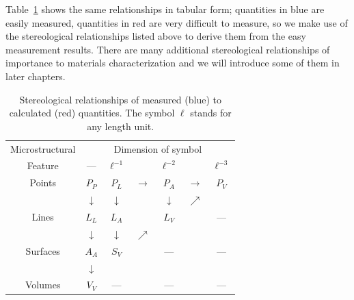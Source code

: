 Table~\ref{\chabbr:tb:relations} shows the same relationships in tabular form; quantities in blue are easily measured, quantities in red are very difficult to measure, so we make use of the stereological relationships listed above to derive them from the easy measurement results.  There are many additional stereological relationships of importance to materials characterization and we will introduce some of them in later chapters.

\begin{table}[h!]
\centering\leavevmode
\begin{tabular}{c|cccccc}
Microstructural & \multicolumn{6}{c}{Dimension of symbol}\\
Feature & --- & $\ell^{-1}$ && $\ell^{-2}$ && $\ell^{-3}$ \\
\hline
Points & {\color{blue}$P_P$} & {\color{blue}$P_L$} & $\rightarrow$ & {\color{blue}$P_A$} &$\rightarrow$ & {\color{red}$P_V$} \\
&$\downarrow$ & $\downarrow$ & & $\downarrow$ &$\nearrow$ & \\
Lines & {\color{blue}$L_L$} & {\color{blue}$L_A$} && {\color{red}$L_V$} && ---\\
&$\downarrow$ & $\downarrow$  &$\nearrow$ & \\
Surfaces & {\color{blue}$A_A$} & {\color{red}$S_V$} && --- && --- \\
&$\downarrow$  \\
Volumes & {\color{red}$V_V$} & ---& & ---& & --- \\
\hline
\end{tabular}
\caption{\label{\chabbr:tb:relations}Stereological relationships of measured (blue) to calculated (red) quantities. The symbol $\ell$ stands for any length unit.}
\end{table}


